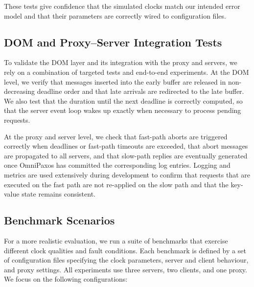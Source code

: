 \documentclass{article}
\begin{document}
These tests give confidence that the simulated clocks match our intended error model and that their parameters are correctly wired to configuration files.

\subsection{DOM and Proxy--Server Integration Tests}
To validate the DOM layer and its integration with the proxy and servers, we rely on a combination of targeted tests and end-to-end experiments. At the DOM level, we verify that messages inserted into the early buffer are released in non-decreasing deadline order and that late arrivals are redirected to the late buffer. We also test that the duration until the next deadline is correctly computed, so that the server event loop wakes up exactly when necessary to process pending requests.

At the proxy and server level, we check that fast-path aborts are triggered correctly when deadlines or fast-path timeouts are exceeded, that abort messages are propagated to all servers, and that slow-path replies are eventually generated once OmniPaxos has committed the corresponding log entries. Logging and metrics are used extensively during development to confirm that requests that are executed on the fast path are not re-applied on the slow path and that the key-value state remains consistent.

\subsection{Benchmark Scenarios}
For a more realistic evaluation, we run a suite of benchmarks that exercise different clock qualities and fault conditions. Each benchmark is defined by a set of configuration files specifying the clock parameters, server and client behaviour, and proxy settings. All experiments use three servers, two clients, and one proxy. We focus on the following configurations:
\end{document}
